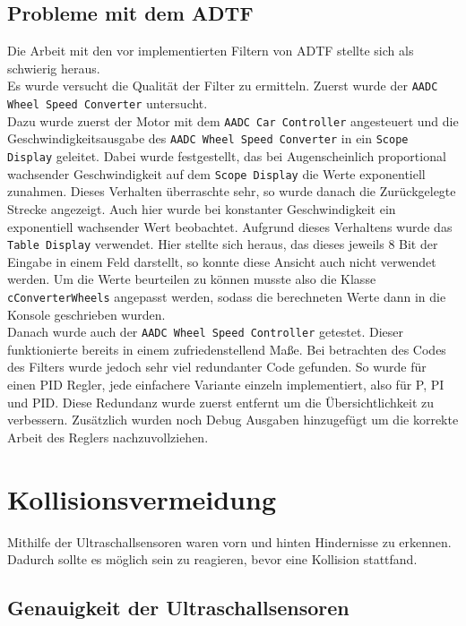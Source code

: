 \documentclass[a4paper,12pt]{report}
\begin{document}
	\section{Probleme mit dem ADTF}
	Die Arbeit mit den vor implementierten Filtern von ADTF stellte sich als schwierig heraus. \\
	Es wurde versucht die Qualität der Filter zu ermitteln. Zuerst wurde der \texttt{AADC Wheel Speed Converter} untersucht. \\
	Dazu wurde zuerst der Motor mit dem \texttt{AADC Car Controller} angesteuert und die Geschwindigkeitsausgabe des \texttt{AADC Wheel Speed Converter} in ein \texttt{Scope Display} geleitet. Dabei wurde festgestellt, das bei Augenscheinlich proportional wachsender Geschwindigkeit auf dem \texttt{Scope Display} die Werte exponentiell zunahmen. Dieses Verhalten überraschte sehr, so wurde danach die Zurückgelegte Strecke angezeigt. Auch hier wurde bei konstanter Geschwindigkeit ein exponentiell wachsender Wert beobachtet. Aufgrund dieses Verhaltens wurde das \texttt{Table Display} verwendet. Hier stellte sich heraus, das dieses jeweils 8 Bit der Eingabe in einem Feld darstellt, so konnte diese Ansicht auch nicht verwendet werden. Um die Werte beurteilen zu können musste also die Klasse \texttt{cConverterWheels} angepasst werden, sodass die berechneten Werte dann in die Konsole geschrieben wurden. \\
	Danach wurde auch der \texttt{AADC Wheel Speed Controller} getestet. Dieser funktionierte bereits in einem zufriedenstellend Maße. Bei betrachten des Codes des Filters wurde jedoch sehr viel redundanter Code gefunden. So wurde für einen PID Regler, jede einfachere Variante einzeln implementiert, also für P, PI und PID. Diese Redundanz wurde zuerst entfernt um die Übersichtlichkeit zu verbessern. Zusätzlich wurden noch Debug Ausgaben hinzugefügt um die korrekte Arbeit des Reglers nachzuvollziehen. \\
	

\chapter{Kollisionsvermeidung}

	Mithilfe der Ultraschallsensoren waren vorn und hinten Hindernisse zu erkennen.
	Dadurch sollte es möglich sein zu reagieren, bevor eine Kollision stattfand.

\section{Genauigkeit der Ultraschallsensoren}
\end{document}
